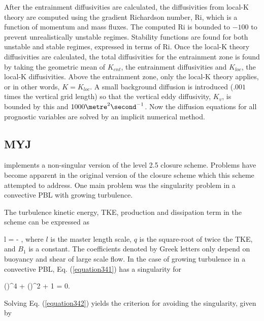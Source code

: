 After the entrainment diffusivities are calculated, the diffusivities from local-K theory are computed using the gradient Richardson number, $\mathrm{Ri}$, which is a function of momentum and mass fluxes. The computed $\mathrm{Ri}$ is bounded to $-100$ to prevent unrealistically unstable regimes. Stability functions are found for both unstable and stable regimes, expressed in terms of $\mathrm{Ri}$. Once the local-K theory diffusivities are calculated, the total diffusivities for the entrainment zone is found by taking the geometric mean of $K_{ent}$, the entrainment diffusivities and ${K_{loc}}$, the local-K diffusivities. Above the entrainment zone, only the local-K theory applies, or in other words, $K=K_{loc}$. A small background diffusion is introduced ($.001$ times the vertical grid length) so that the vertical eddy diffusivity, $K_v$, is bounded by this and $1000\metre^2 \second^{-1}$. Now the diffusion equations for all prognostic variables are solved by an implicit numerical method.

\subsection{MYJ}
\label{pbl-myj-362}

 \citet{Jan02} implements a non-singular version of the  \citet{MY82} level 2.5 closure scheme. Problems have become apparent in the original version of the closure scheme which this scheme attempted to address. One main problem was the singularity problem in a convective PBL with growing turbulence.

The turbulence kinetic energy, TKE, production and dissipation term in the  \citet{MY82} scheme can be expressed as

\bea
l =  - ,\label{equation341}
\eea
\noindent
 where $l$ is the master length scale, $q$ is the square-root of twice the TKE, and $B_1$ is a constant. The coefficients denoted by Greek letters only depend on buoyancy and shear of large scale flow. In the case of growing turbulence in a convective PBL, Eq. (\autoref{equation341}) has a singularity for

\be
\gamma\left(\right)^4 + \delta\left(\right)^2 + 1 = 0. \label{equation342}
\ee

Solving Eq. (\autoref{equation342}) yields the criterion for avoiding the singularity, given by

